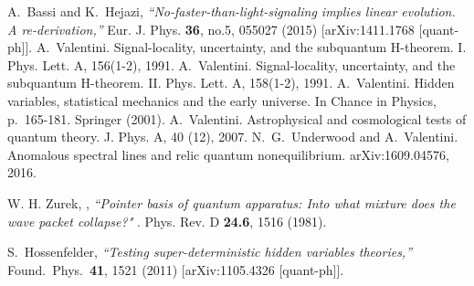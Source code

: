 \documentclass[11pt,twoside,A4]{article}
\begin{document}
\begin{thebibliography}{99}
{ %
A.~Bassi and K.~Hejazi,
{\sl ``No-faster-than-light-signaling implies linear evolution. A re-derivation,''}
Eur. J. Phys. \textbf{36}, no.5, 055027 (2015)
[arXiv:1411.1768 [quant-ph]].
 A.~Valentini. Signal-locality, uncertainty, and the subquantum H-theorem. I. Phys. Lett. A, 156(1-2), 1991.
 A.~Valentini. Signal-locality, uncertainty, and the subquantum H-theorem. II. Phys. Lett. A, 158(1-2), 1991.
 A.~Valentini. Hidden variables, statistical mechanics and the early universe. In Chance in Physics, p.\ 165-181. Springer
(2001).
 A.~Valentini. Astrophysical and cosmological tests of quantum theory. J. Phys. A, 40 (12), 2007.
 N.~G.~Underwood and A.~Valentini. Anomalous spectral lines and relic quantum nonequilibrium. arXiv:1609.04576, 2016.

 
 W. H. Zurek, , {\sl ``Pointer basis of quantum apparatus: Into what mixture does the wave packet collapse?" }. Phys. Rev. D {\bf 24.6}, 1516 (1981).

  S.~Hossenfelder,
  {\sl ``Testing super-deterministic hidden variables theories,''}
  Found.\ Phys.\  {\bf 41}, 1521 (2011)
  [arXiv:1105.4326 [quant-ph]].



 
 
 
}


\end{thebibliography}
\end{document}
